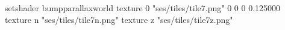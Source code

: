 setshader bumpparallaxworld
texture 0 "ses/tiles/tile7.png" 0 0 0 0.125000
texture n "ses/tiles/tile7n.png"
texture z "ses/tiles/tile7z.png"


